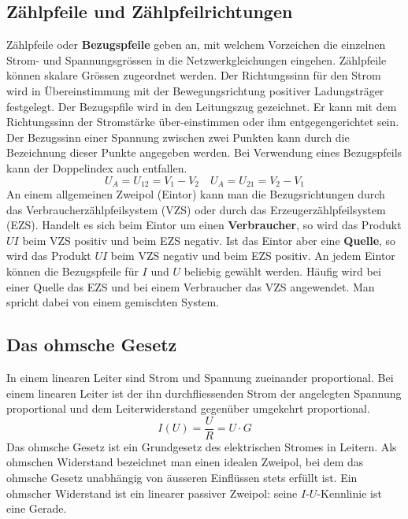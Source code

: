 \subsection{Zählpfeile und Zählpfeilrichtungen}
Zählpfeile oder \textbf{Bezugspfeile} geben an, mit welchem Vorzeichen die einzelnen Strom- und Spannungsgrössen in die Netzwerkgleichungen eingehen. Zählpfeile können skalare Grössen zugeordnet werden.
\newline\newline
Der Richtungssinn für den Strom wird in Übereinstimmung mit der Bewegungsrichtung positiver Ladungsträger festgelegt. Der Bezugspfile wird in den Leitungszug gezeichnet. Er kann mit dem Richtungssinn der Stromstärke über-einstimmen oder ihm entgegengerichtet sein.
\newline\newline
Der Bezugssinn einer Spannung zwischen zwei Punkten kann durch die Bezeichnung dieser Punkte angegeben werden. Bei Verwendung eines Bezugspfeils kann der Doppelindex auch entfallen.
\begin{equation}
\boxed{U_A=U_{12}=V_1-V_2}\quad \boxed{U_A=U_{21}=V_2-V_1}
\end{equation}
An einem allgemeinen Zweipol (Eintor) kann man die Bezugsrichtungen durch das Verbraucherzählpfeilsystem (VZS) oder durch das Erzeugerzählpfeilsystem (EZS).
\newline\newline
Handelt es sich beim Eintor um einen \textbf{Verbraucher}, so wird das Produkt $UI$ beim VZS positiv und beim EZS negativ. Ist das Eintor aber eine \textbf{Quelle}, so wird das Produkt $UI$ beim VZS negativ und beim EZS positiv.
\newline\newline
An jedem Eintor können die Bezugspfeile für $I$ und $U$ beliebig gewählt werden. Häufig wird bei einer Quelle das EZS und bei einem Verbraucher das VZS angewendet. Man spricht dabei von einem gemischten System.
\subsection{Das ohmsche Gesetz}
In einem linearen Leiter sind Strom und Spannung zueinander proportional. Bei einem linearen Leiter ist der ihn durchfliessenden Strom der angelegten Spannung proportional und dem Leiterwiderstand gegenüber umgekehrt proportional.
\begin{equation}
\boxed{I\left(U\right)=\dfrac{U}{R}=U\cdot G}
\end{equation}
Das ohmsche Gesetz ist ein Grundgesetz des elektrischen Stromes in Leitern. Als ohmschen Widerstand bezeichnet man einen idealen Zweipol, bei dem das ohmsche Gesetz unabhängig von äusseren Einflüssen stets erfüllt ist. Ein ohmscher Widerstand ist ein linearer passiver Zweipol: seine $I$-$U$-Kennlinie ist eine Gerade.
